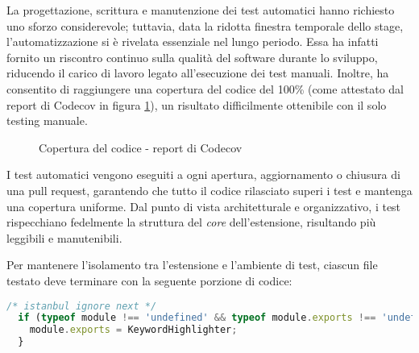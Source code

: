 \vspace{10pt}
\par\noindent La progettazione, scrittura e manutenzione dei test automatici hanno richiesto uno sforzo considerevole; tuttavia, data la ridotta finestra temporale dello stage, l’automatizzazione si è rivelata essenziale nel lungo periodo. Essa ha infatti fornito un riscontro continuo sulla qualità del software durante lo sviluppo, riducendo il carico di lavoro legato all’esecuzione dei test manuali. Inoltre, ha consentito di raggiungere una copertura del codice del 100\% (come attestato dal report di Codecov in figura \ref{fig:report_codecov}), un risultato difficilmente ottenibile con il solo testing manuale.

\begin{figure}[H]
  \centering 
  \caption{Copertura del codice - report di Codecov}
  \label{fig:report_codecov}
\end{figure}

\par\noindent I test automatici vengono eseguiti a ogni apertura, aggiornamento o chiusura di una \gls{pull request}, garantendo che tutto il codice rilasciato superi i test e mantenga una copertura uniforme. Dal punto di vista architetturale e organizzativo, i test rispecchiano fedelmente la struttura del \textit{core} dell’estensione, risultando più leggibili e manutenibili. 

\vspace{10pt}
\begin{samepage}
\end{samepage}

\vspace{10pt}
\par\noindent Per mantenere l’isolamento tra l'estensione e l’ambiente di test, ciascun file testato deve terminare con la seguente porzione di codice:

\vspace{10pt}
\begin{samepage}
\begin{lstlisting}[language=JavaScript]
  /* istanbul ignore next */
  if (typeof module !== 'undefined' && typeof module.exports !== 'undefined') {
    module.exports = KeywordHighlighter;
  }
\end{lstlisting}
\end{samepage}

